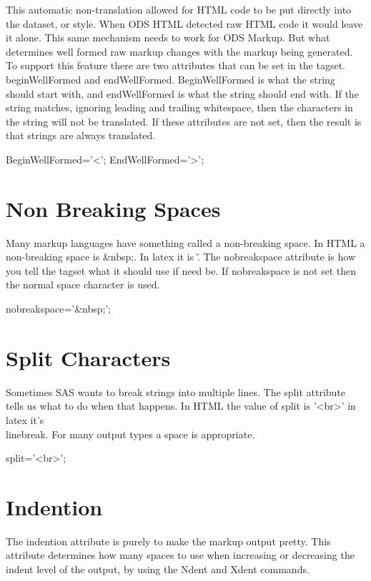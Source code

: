 This automatic non-translation
allowed for HTML code to be put directly into the dataset, or style.  When
ODS HTML detected raw HTML code it would leave it alone.  This same mechanism
needs to work for ODS Markup.  But what determines well formed raw markup changes
with the markup being generated.  To support this feature there are two attributes
that can be set in the tagset.  beginWellFormed and endWellFormed.  BeginWellFormed
is what the string should start with, and endWellFormed is what the string should 
end with.  If the string matches, ignoring leading and trailing whitespace, then
the characters in the string will not be translated.  If these attributes are not
set, then the result is that strings are always translated.

\begin{sfvcode}
   BeginWellFormed='<';
   EndWellFormed='>';
\end{sfvcode}

\section{Non Breaking Spaces}
Many markup languages have something called a non-breaking space.  In HTML
a non-breaking space is \&nbsp;.  In latex it is \~.  The nobreakspace attribute is how you
tell the tagset what it should use if need be.  If nobreakspace is not set 
then the normal space character is used.

\begin{sfvcode}
   nobreakspace='&nbsp;';
\end{sfvcode}

\section{Split Characters}
Sometimes SAS wants to break strings into multiple lines.  The split attribute
tells us what to do when that happens.  In HTML the value of split is '<br>' in
latex it's \\linebreak.  For many output types a space is appropriate.

\begin{sfvcode}
   split='<br>';
\end{sfvcode}

\section{Indention}
The indention attribute is purely to make the markup output pretty. 
This attribute determines how many spaces to use
when increasing or decreasing the indent level of the output, by using
the Ndent and Xdent commands.  

